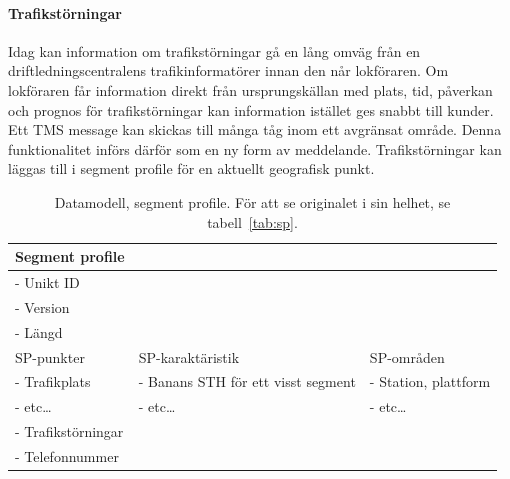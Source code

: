 \paragraph{Trafikstörningar}
Idag kan information om trafikstörningar gå en lång omväg från en driftledningscentralens trafikinformatörer innan den når lokföraren.
Om lokföraren får information direkt från ursprungskällan med plats, tid, påverkan och prognos för trafikstörningar kan information istället ges snabbt till kunder.
Ett TMS message kan skickas till många tåg inom ett avgränsat område.
Denna funktionalitet införs därför som en ny form av meddelande.
Trafikstörningar kan läggas till i segment profile för en aktuellt geografisk punkt.
\begin{table}
    \centering
    \begin{tabular}{|l|l|l|}
        \hline
        \textbf{Segment profile} & & \\
        \hline
        - Unikt ID & & \\
        - Version & & \\
        - Längd & & \\
        \hline
        SP-punkter & SP-karaktäristik & SP-områden \\
        - Trafikplats & - Banans STH för ett visst segment & - Station, plattform \\
        - etc\ldots & - etc\ldots & - etc\ldots \\
        \color{blue}
        - Trafikstörningar & & \\
        \color{blue}
        - Telefonnummer & & \\
        \hline
    \end{tabular}
    \caption{Datamodell, segment profile. För att se originalet i sin helhet, se tabell~\ref{tab:sp}.}
    \label{tab:spImproved}
\end{table}
